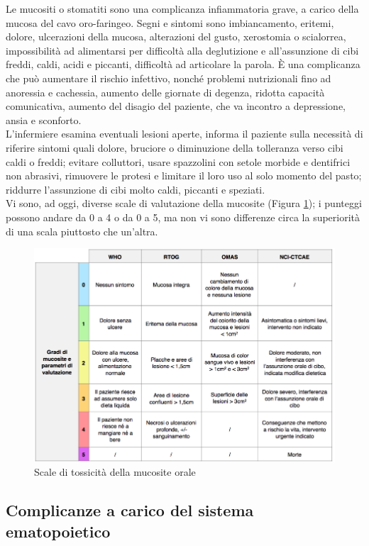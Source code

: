 Le mucositi o stomatiti sono una complicanza infiammatoria grave, a carico della mucosa del cavo oro-faringeo. 
Segni e sintomi sono imbiancamento, eritemi, dolore, ulcerazioni della mucosa, alterazioni del gusto, xerostomia o 
scialorrea, impossibilità ad alimentarsi per difficoltà alla deglutizione e all’assunzione di cibi freddi, caldi, 
acidi e piccanti, difficoltà ad articolare la parola. È una complicanza che può aumentare il rischio infettivo, 
nonché problemi nutrizionali fino ad anoressia e cachessia, aumento delle giornate di degenza, ridotta capacità 
comunicativa, aumento del disagio del paziente, che va incontro a depressione, ansia e sconforto\cite{mucositi}.\\ 
L’infermiere esamina eventuali lesioni aperte, informa il paziente sulla necessità di riferire 
sintomi quali dolore, bruciore o diminuzione della tolleranza verso cibi caldi o freddi; evitare colluttori, 
usare spazzolini con setole morbide e dentifrici non abrasivi, rimuovere le 
protesi e limitare il loro uso al solo momento del pasto; riddurre l'assunzione di cibi molto caldi, 
piccanti e speziati\cite{mucositi}.\\ 
Vi sono, ad oggi, diverse scale di valutazione della mucosite (Figura \ref{fig:FIGURE_4.2}); i punteggi possono 
andare da 0 a 4 o da 0 a 5, ma non vi sono differenze circa la superiorità di una scala piuttosto che un’altra\cite{SCALEmucositi}.

\begin{figure}[H]
    \begin{center}
    \includegraphics[width=0.5\columnwidth]{img/MUCOSITE.png}
    \vspace{-3mm}
    \end{center}
    \caption{Scale di tossicità della mucosite orale
    \cite{SCALEmucositi}}
    \label{fig:FIGURE_4.2}
\end{figure}

\subsection{Complicanze a carico del sistema ematopoietico}

